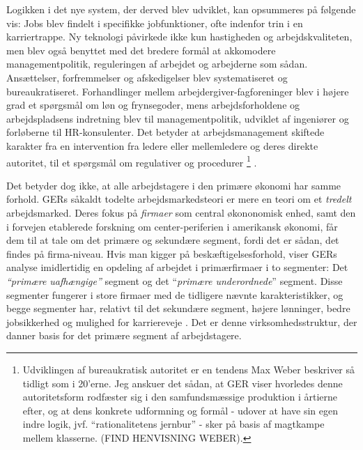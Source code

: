 Logikken i det nye system, der derved blev udviklet, kan opsummeres på følgende vis: Jobs blev findelt i specifikke jobfunktioner, ofte indenfor trin i en karriertrappe. Ny teknologi påvirkede ikke kun hastigheden og arbejdskvaliteten, men blev også benyttet med det bredere formål at akkomodere managementpolitik, reguleringen af arbejdet og arbejderne som sådan. Ansættelser, forfremmelser og afskedigelser blev systematiseret og bureaukratiseret. Forhandlinger mellem arbejdergiver-fagforeninger blev i højere grad et spørgsmål om løn og frynsegoder, mens arbejdsforholdene og arbejdspladsens indretning blev til managementpolitik, udviklet af ingeniører og forløberne til HR-konsulenter. Det betyder at arbejdsmanagement skiftede karakter fra en intervention fra ledere eller mellemledere og deres direkte autoritet, til et spørgsmål om regulativer og procedurer \parencite[189]{Gordon1982}%
%
\footnote{Udviklingen af bureaukratisk autoritet er en tendens Max Weber beskriver så tidligt som i 20'erne. Jeg anskuer det sådan, at GER viser hvorledes denne autoritetsform rodfæster sig i den samfundsmæssige produktion i årtierne efter, og at dens konkrete udformning og formål - udover at have sin egen indre logik, jvf. “rationalitetens jernbur” - sker på basis af magtkampe mellem klasserne. (FIND HENVISNING WEBER).}%
%
. 

Det betyder dog ikke, at alle arbejdstagere i den primære økonomi har samme forhold. GERs såkaldt todelte arbejdsmarkedsteori er mere en teori om et \emph{tredelt} arbejdsmarked. Deres fokus på \emph{firmaer} som central økononomisk enhed, samt den i forvejen etablerede forskning om center-periferien i amerikansk økonomi, får dem til at tale om det primære og sekundære segment, fordi det er sådan, det findes på firma-niveau. Hvis man kigger på beskæftigelsesforhold, viser GERs analyse imidlertidig en opdeling af arbejdet i primærfirmaer i to segmenter: Det \emph{“primære uafhængige”} segment og det “\emph{primære underordnede}” segment. Disse segmenter fungerer i store firmaer med de tidligere nævnte karakteristikker, og begge segmenter har, relativt til det sekundære segment, højere lønninger, bedre jobsikkerhed og mulighed for karriereveje \parencite[202]{Gordon1982} \label{GERs tre segmenter}. Det er denne virksomhedsstruktur, der danner basis for det primære segment af arbejdstagere.

